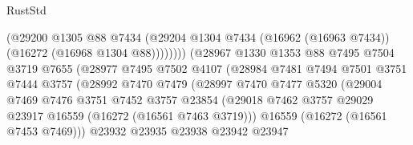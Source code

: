 \begin{lexlean}{RustStd}
\begin{coremodule}
                                      (@29200
                                        @1305
                                        @88
                                        @7434
                                        (@29204
                                          @1304
                                          @7434
                                          (@16962 (@16963 @7434))
                                          (@16272 (@16968 @1304 @88))))))))
                              (@28967
                                @1330
                                @1353
                                @88
                                @7495
                                @7504
                                @3719
                                @7655
                                (@28977
                                  @7495
                                  @7502
                                  @4107
                                  (@28984
                                    @7481
                                    @7494
                                    @7501
                                    @3751
                                    @7444
                                    @3757
                                    (@28992
                                      @7470
                                      @7479
                                      (@28997
                                        @7470
                                        @7477
                                        @5320
                                        (@29004
                                          @7469
                                          @7476
                                          @3751
                                          @7452
                                          @3757
                                          @23854
                                          (@29018
                                            @7462
                                            @3757
                                            @29029
                                            @23917
                                            @16559
                                            (@16272 (@16561 @7463 @3719)))
                                          @16559
                                          (@16272 (@16561 @7453 @7469)))
                                        @23932
                                        @23935
                                        @23938
                                        @23942
                                        @23947

\end{coremodule}
\end{lexlean}
